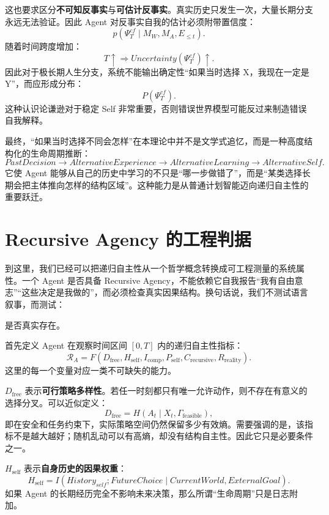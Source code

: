 这也要求区分\textbf{不可知反事实}与\textbf{可估计反事实}。真实历史只发生一次，大量长期分支永远无法验证。因此 Agent 对反事实自我的估计必须附带置信度：
\[
p(
\Psi_T^{cf}
\mid
M_W,M_A,E_{\le t}
).
\]
随着时间跨度增加：
\[
T\uparrow
\Rightarrow
Uncertainty(\Psi_T^{cf})\uparrow.
\]
因此对于极长期人生分支，系统不能输出确定性“如果当时选择 X，我现在一定是 Y”，而应形成分布：
\[
P(\Psi_T^{cf}).
\]
这种认识论谦逊对于稳定 Self 非常重要，否则错误世界模型可能反过来制造错误自我解释。

最终，“如果当时选择不同会怎样”在本理论中并不是文学式追忆，而是一种高度结构化的生命周期推断：
\[
PastDecision
\rightarrow
AlternativeExperience
\rightarrow
AlternativeLearning
\rightarrow
AlternativeSelf.
\]
它使 Agent 能够从自己的历史中学习的不只是“哪一步做错了”，而是“某类选择长期会把主体推向怎样的结构区域”。这种能力是从普通计划智能迈向递归自主性的重要跃迁。

\section{Recursive Agency 的工程判据}

到这里，我们已经可以把递归自主性从一个哲学概念转换成可工程测量的系统属性。一个 Agent 是否具备 Recursive Agency，不能依赖它自我报告“我有自由意志”“这些决定是我做的”，而必须检查真实因果结构。换句话说，我们不测试语言叙事，而测试：
\begin{statementbox}
\centering
{}
\end{statementbox}
是否真实存在。

首先定义 Agent 在观察时间区间 $[0,T]$ 内的递归自主性指标：
\[
\mathcal R_A
=
F(
D_{\mathrm{free}},
H_{\mathrm{self}},
I_{\mathrm{comp}},
P_{\mathrm{self}},
C_{\mathrm{recursive}},
R_{\mathrm{reality}}
).
\]
这里的每一个变量对应一类不可缺失的能力。

$D_{\mathrm{free}}$ 表示\textbf{可行策略多样性}。若任一时刻都只有唯一允许动作，则不存在有意义的选择分叉。可以近似定义：
\[
D_{\mathrm{free}}
=
H(
A_t
\mid
X_t,\Gamma_{\mathrm{feasible}}
),
\]
即在安全和任务约束下，实际策略空间仍然保留多少有效熵。需要强调的是，该指标不是越大越好；随机乱动可以有高熵，却没有结构自主性。因此它只是必要条件之一。

$H_{\mathrm{self}}$ 表示\textbf{自身历史的因果权重}：
\[
H_{\mathrm{self}}
=
I(
History_{self};
FutureChoice
\mid
CurrentWorld,ExternalGoal
).
\]
如果 Agent 的长期经历完全不影响未来决策，那么所谓“生命周期”只是日志附加。

